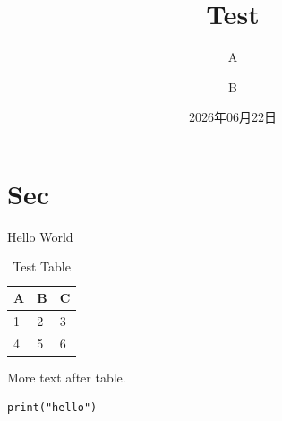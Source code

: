 \documentclass[twocolumn,dark,nomath]{harryopo-paper}
\title{Test}
\author{A \and B}
\date{2026年06月22日}
\begin{document}
\maketitlewithabstract
\section{Sec}
Hello World
\begin{table}[htbp]
  \centering
  \caption{Test Table}
  \begin{tabular}{lll}
    \toprule
    A & B & C \\
    \midrule
    1 & 2 & 3 \\
    4 & 5 & 6 \\
    \bottomrule
  \end{tabular}
\end{table}
More text after table.
\begin{lstlisting}[style=pystyle, caption=Code]
print("hello")
\end{lstlisting}
\end{document}
